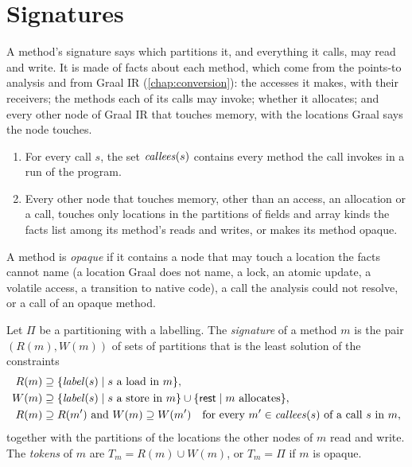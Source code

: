 \section{Signatures}\label{sec:ee-signatures}

A method's signature says which partitions it, and everything it calls, may
read and write. It is made of facts about each method, which come from the
points-to analysis and from Graal IR (\cref{chap:conversion}): the accesses it
makes, with their receivers; the methods each of its calls may invoke; whether
it allocates; and every other node of Graal IR that touches memory, with the
locations Graal says the node touches.

\begin{assumption}\label{as:ee-facts}
\begin{enumerate}
\item For every call $s$, the set $\mathit{callees}(s)$ contains every method the call
  invokes in a run of the program.
\item Every other node that touches memory, other than an access, an allocation
  or a call, touches only locations in the partitions of fields and array kinds
  the facts list among its method's reads and writes, or makes its method
  opaque.
\end{enumerate}
A method is \emph{opaque} if it contains a node that may touch a location the
facts cannot name (a location Graal does not name, a lock, an atomic update, a
volatile access, a transition to native code), a call the analysis could not
resolve, or a call of an opaque method.
\end{assumption}

\begin{definition}[Signature]\label{def:ee-signature}
Let $\Pi$ be a partitioning with a labelling. The \emph{signature} of a method
$m$ is the pair $(R(m), W(m))$ of sets of partitions that is the least solution
of the constraints
\begin{align*}
R(m) &\supseteq \{\mathit{label}(s) \mid s \text{ a load in } m\},\\
W(m) &\supseteq \{\mathit{label}(s) \mid s \text{ a store in } m\} \cup \{\mathsf{rest} \mid m \text{ allocates}\},\\
R(m) &\supseteq R(m') \text{ and } W(m) \supseteq W(m') \quad \text{for every } m' \in \mathit{callees}(s) \text{ of a call } s \text{ in } m,
\end{align*}
together with the partitions of the locations the other nodes of $m$ read and
write. The \emph{tokens} of $m$ are $T_m = R(m) \cup W(m)$, or $T_m = \Pi$ if $m$
is opaque.
\end{definition}


